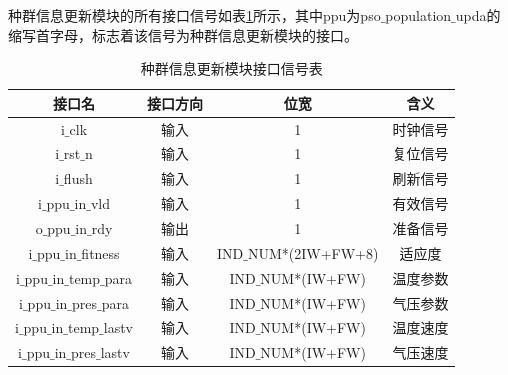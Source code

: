 种群信息更新模块的所有接口信号如表\ref{tab:种群信息更新模块接口信号表}所示，其中ppu为pso$\_$population$\_$upda的缩写首字母，标志着该信号为种群信息更新模块的接口。
\begin{table}[htb]
    \centering
    \caption{种群信息更新模块接口信号表}
    \label{tab:种群信息更新模块接口信号表}
    \begin{tabular}{c|c|c|c}
        \hline
        接口名                               & 接口方向  & 位宽               &含义                        \\ \hline
        i$\_$clk                                       & 输入      & 1                     & 时钟信号             \\ \hline
        i$\_$rst$\_$n                                  & 输入      & 1                     & 复位信号             \\ \hline
        i$\_$flush                                     & 输入      & 1                     & 刷新信号             \\ \hline
        i$\_$ppu$\_$in$\_$vld                          & 输入      & 1                     & 有效信号        \\ \hline
        o$\_$ppu$\_$in$\_$rdy                          & 输出      & 1                     & 准备信号        \\ \hline
        i$\_$ppu$\_$in$\_$fitness                      & 输入      & IND$\_$NUM*(2IW+FW+8) & 适应度          \\ \hline
        i$\_$ppu$\_$in$\_$temp$\_$para                 & 输入      & IND$\_$NUM*(IW+FW)    & 温度参数        \\ \hline
        i$\_$ppu$\_$in$\_$pres$\_$para                 & 输入      & IND$\_$NUM*(IW+FW)    & 气压参数        \\ \hline
        i$\_$ppu$\_$in$\_$temp$\_$lastv                & 输入      & IND$\_$NUM*(IW+FW)    & 温度速度        \\ \hline
        i$\_$ppu$\_$in$\_$pres$\_$lastv                & 输入      & IND$\_$NUM*(IW+FW)    & 气压速度       \\ \hline


\end{tabular}
\end{table}
